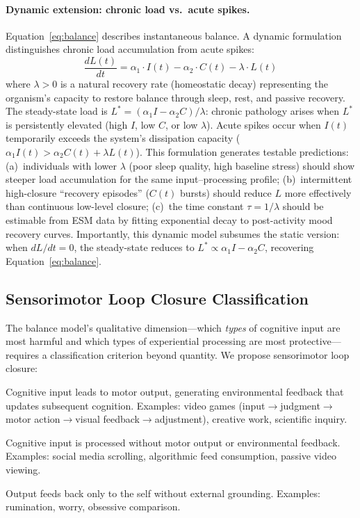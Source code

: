 \documentclass[a4paper,11pt,titlepage]{article}
\begin{document}
\paragraph{Dynamic extension: chronic load vs.\ acute spikes.}
Equation~\eqref{eq:balance} describes instantaneous balance. A dynamic formulation distinguishes chronic load accumulation from acute spikes:
\begin{equation}
\frac{dL(t)}{dt} = \alpha_1 \cdot I(t) - \alpha_2 \cdot C(t) - \lambda \cdot L(t)
\label{eq:dynamic}
\end{equation}
where $\lambda > 0$ is a natural recovery rate (homeostatic decay) representing the organism's capacity to restore balance through sleep, rest, and passive recovery. The steady-state load is $L^* = (\alpha_1 I - \alpha_2 C)/\lambda$: chronic pathology arises when $L^*$ is persistently elevated (high $I$, low $C$, or low $\lambda$). Acute spikes occur when $I(t)$ temporarily exceeds the system's dissipation capacity ($\alpha_1 I(t) > \alpha_2 C(t) + \lambda L(t)$). This formulation generates testable predictions: (a)~individuals with lower $\lambda$ (poor sleep quality, high baseline stress) should show steeper load accumulation for the same input--processing profile; (b)~intermittent high-closure ``recovery episodes'' ($C(t)$ bursts) should reduce $L$ more effectively than continuous low-level closure; (c)~the time constant $\tau = 1/\lambda$ should be estimable from ESM data by fitting exponential decay to post-activity mood recovery curves. Importantly, this dynamic model subsumes the static version: when $dL/dt = 0$, the steady-state reduces to $L^* \propto \alpha_1 I - \alpha_2 C$, recovering Equation~\eqref{eq:balance}.


\subsection{Sensorimotor Loop Closure Classification}\label{sec:loop-closure}

The balance model's qualitative dimension---which \emph{types} of cognitive input are most harmful and which types of experiential processing are most protective---requires a classification criterion beyond quantity. We propose sensorimotor loop closure:

\begin{description}[leftmargin=2em]
\item[Closed loop (adaptive):] Cognitive input leads to motor output, generating environmental feedback that updates subsequent cognition. Examples: video games (input$\to$judgment$\to$motor action$\to$visual feedback$\to$adjustment), creative work, scientific inquiry.
\item[Open loop (maladaptive):] Cognitive input is processed without motor output or environmental feedback. Examples: social media scrolling, algorithmic feed consumption, passive video viewing.
\item[Self-referential loop (pathological):] Output feeds back only to the self without external grounding. Examples: rumination, worry, obsessive comparison.
\end{description}
\end{document}
